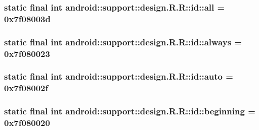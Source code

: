 \hypertarget{classandroid_1_1support_1_1design_1_1_r_1_1id_bf0775b13e2c0c3b11551c003467c7ce}{
\subsubsection[{all}]{\setlength{\rightskip}{0pt plus 5cm}static final int android::support::design.R.R::id::all = 0x7f08003d}}
\label{classandroid_1_1support_1_1design_1_1_r_1_1id_bf0775b13e2c0c3b11551c003467c7ce}


\hypertarget{classandroid_1_1support_1_1design_1_1_r_1_1id_73c02ccd2771bec35aef9bb9bc245352}{
\subsubsection[{always}]{\setlength{\rightskip}{0pt plus 5cm}static final int android::support::design.R.R::id::always = 0x7f080023}}
\label{classandroid_1_1support_1_1design_1_1_r_1_1id_73c02ccd2771bec35aef9bb9bc245352}


\hypertarget{classandroid_1_1support_1_1design_1_1_r_1_1id_79e4e49718c8771173fbea46a7593af1}{
\subsubsection[{auto}]{\setlength{\rightskip}{0pt plus 5cm}static final int android::support::design.R.R::id::auto = 0x7f08002f}}
\label{classandroid_1_1support_1_1design_1_1_r_1_1id_79e4e49718c8771173fbea46a7593af1}


\hypertarget{classandroid_1_1support_1_1design_1_1_r_1_1id_5afa3b06d8a7a0de8546ff0e5c23a337}{
\subsubsection[{beginning}]{\setlength{\rightskip}{0pt plus 5cm}static final int android::support::design.R.R::id::beginning = 0x7f080020}}
\label{classandroid_1_1support_1_1design_1_1_r_1_1id_5afa3b06d8a7a0de8546ff0e5c23a337}


